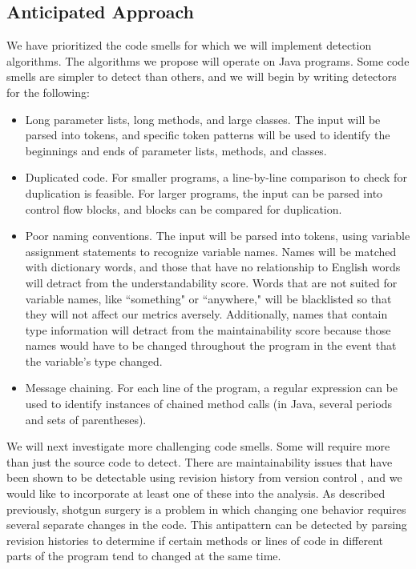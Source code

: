 \documentclass{sig-alternate}
\begin{document}
\subsection{Anticipated Approach}
\label{subsec:approach}

We have prioritized the code smells for which we will implement detection algorithms. The algorithms we propose will operate on Java programs. Some code smells are simpler to detect than others, and we will begin by writing detectors for the following:
\begin{itemize}
\item Long parameter lists, long methods, and large classes. The input will be parsed into tokens, and specific token patterns will be used to identify the beginnings and ends of parameter lists, methods, and classes.
\item Duplicated code.  For smaller programs, a line-by-line comparison to check for duplication is feasible. For larger programs, the input can be parsed into control flow blocks, and blocks can be compared for duplication. 
\item Poor naming conventions. The input will be parsed into tokens, using variable assignment statements to recognize variable names. Names will be matched with dictionary words, and those that have no relationship to English words will detract from the understandability score. Words that are not suited for variable names, like ``something" or ``anywhere," will be blacklisted so that they will not affect our metrics aversely.  Additionally, names that contain type information will detract from the maintainability score because those names would have to be changed throughout the program in the event that the variable's type changed.
\item Message chaining. For each line of the program, a regular expression can be used to identify instances of chained method calls (in Java, several periods and sets of  parentheses). 
\end{itemize}
We will next investigate more challenging code smells. Some will require more than just the source code to detect. There are maintainability issues that have been shown to be detectable using revision history from version control \cite{palomba}, and we would like to incorporate at least one of these into the analysis.  As described previously, shotgun surgery is a problem in which changing one behavior requires several separate changes in the code.  This antipattern can be detected by parsing revision histories to determine if certain methods or lines of code in different parts of the program tend to changed at the same time.
\end{document}
